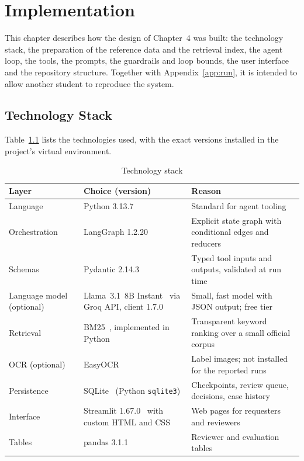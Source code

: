 \chapter{Implementation}

This chapter describes how the design of Chapter~4 was built: the technology stack, the preparation
of the reference data and the retrieval index, the agent loop, the tools, the prompts, the guardrails
and loop bounds, the user interface and the repository structure. Together with
Appendix~\ref{app:run}, it is intended to allow another student to reproduce the system.

\section{Technology Stack}

Table~\ref{tab:stack} lists the technologies used, with the exact versions installed in the project's
virtual environment.

\begin{table}[H]
\centering
\caption{Technology stack}
\label{tab:stack}
\small
\begin{tabularx}{\linewidth}{@{}>{\raggedright\arraybackslash}p{3.4cm} >{\raggedright\arraybackslash}p{4.4cm} >{\raggedright\arraybackslash}X@{}}
\toprule
\textbf{Layer} & \textbf{Choice (version)} & \textbf{Reason} \\ \midrule
Language & Python 3.13.7 & Standard for agent tooling \\
Orchestration & LangGraph 1.2.20~\cite{langgraph} & Explicit state graph with conditional edges and reducers \\
Schemas & Pydantic 2.14.3~\cite{pydantic} & Typed tool inputs and outputs, validated at run time \\
Language model (optional) & Llama~3.1~8B Instant~\cite{llama3} via Groq API, client 1.7.0~\cite{groq} & Small, fast model with JSON output; free tier \\
Retrieval & BM25~\cite{robertson2009bm25}, implemented in Python & Transparent keyword ranking over a small official corpus \\
OCR (optional) & EasyOCR~\cite{easyocr} & Label images; not installed for the reported runs \\
Persistence & SQLite~\cite{sqlite} (Python \texttt{sqlite3}) & Checkpoints, review queue, decisions, case history \\
Interface & Streamlit 1.67.0~\cite{streamlit} with custom HTML and CSS & Web pages for requesters and reviewers \\
Tables & pandas 3.1.1 & Reviewer and evaluation tables \\
\bottomrule
\end{tabularx}
\end{table}

